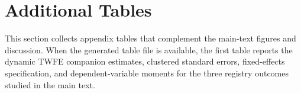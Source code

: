 \section{Additional Tables}
\label{app:additional-tables}

This section collects appendix tables that complement the main-text figures and discussion. When the generated table file is available, the first table reports the dynamic TWFE companion estimates, clustered standard errors, fixed-effects specification, and dependent-variable moments for the three registry outcomes studied in the main text.


\begin{table}[htbp]
\centering

\end{table}

\begin{table}[htbp]
\centering
\caption{Compositional regressions for decomposition interactions}
\label{tab:compositional-regressions}

\end{table}
